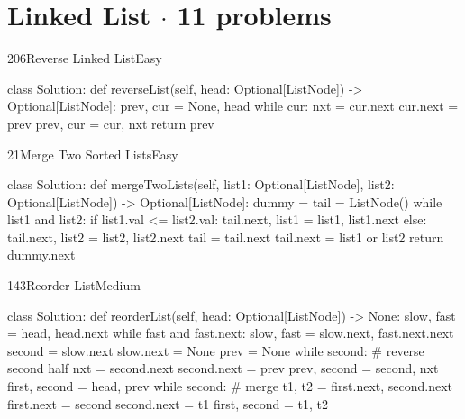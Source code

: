 \section{Linked List \texorpdfstring{{\normalsize\color{muted}$\cdot$ 11 problems}}{- 11 problems}}

\begin{problem}{206}{Reverse Linked List}{Easy}
\begin{code}
class Solution:
    def reverseList(self, head: Optional[ListNode]) -> Optional[ListNode]:
        prev, cur = None, head
        while cur:
            nxt = cur.next
            cur.next = prev
            prev, cur = cur, nxt
        return prev
\end{code}
\end{problem}

\begin{problem}{21}{Merge Two Sorted Lists}{Easy}
\begin{code}
class Solution:
    def mergeTwoLists(self, list1: Optional[ListNode], list2: Optional[ListNode]) -> Optional[ListNode]:
        dummy = tail = ListNode()
        while list1 and list2:
            if list1.val <= list2.val:
                tail.next, list1 = list1, list1.next
            else:
                tail.next, list2 = list2, list2.next
            tail = tail.next
        tail.next = list1 or list2
        return dummy.next
\end{code}
\end{problem}

\begin{problem}{143}{Reorder List}{Medium}
\begin{code}
class Solution:
    def reorderList(self, head: Optional[ListNode]) -> None:
        slow, fast = head, head.next
        while fast and fast.next:
            slow, fast = slow.next, fast.next.next
        second = slow.next
        slow.next = None
        prev = None
        while second:                      # reverse second half
            nxt = second.next
            second.next = prev
            prev, second = second, nxt
        first, second = head, prev
        while second:                      # merge
            t1, t2 = first.next, second.next
            first.next = second
            second.next = t1
            first, second = t1, t2
\end{code}
\end{problem}

